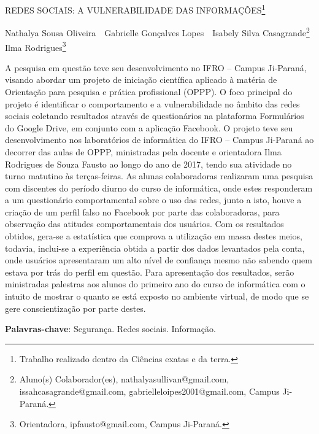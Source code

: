 \documentclass[article,12pt,onesidea,4paper,english,brazil]{abntex2}
\begin{document}
	
	
	\frenchspacing 
	
	\begin{center}
		\LARGE REDES SOCIAIS: A VULNERABILIDADE DAS INFORMAÇÕES\footnote{Trabalho realizado dentro da Ciências exatas e da terra.}
		
		\normalsize
		Nathalya Sousa Oliveira \,\, Gabrielle Gonçalves Lopes \,\, Isabely Silva Casagrande\footnote{Aluno(s) Colaborador(es), nathalyasullivan@gmail.com, issahcasagrande@gmail.com, gabrielleloipes2001@gmail.com, Campus Ji-Paraná.} 
	Ilma Rodrigues\footnote{Orientadora, ipfausto@gmail.com, Campus Ji-Paraná.} 

	\end{center}
	
	\noindent A pesquisa em questão teve seu desenvolvimento no IFRO – Campus Ji-Paraná,
	visando abordar um projeto de iniciação científica aplicado à matéria de Orientação
	para pesquisa e prática profissional (OPPP). O foco principal do projeto é identificar
	o comportamento e a vulnerabilidade no âmbito das redes sociais coletando
	resultados através de questionários na plataforma Formulários do Google Drive, em
	conjunto com a aplicação Facebook. O projeto teve seu desenvolvimento nos
	laboratórios de informática do IFRO – Campus Ji-Paraná ao decorrer das aulas de
	OPPP, ministradas pela docente e orientadora Ilma Rodrigues de Souza Fausto ao
	longo do ano de 2017, tendo sua atividade no turno matutino às terças-feiras. As
	alunas colaboradoras realizaram uma pesquisa com discentes do período diurno do
	curso de informática, onde estes responderam a um questionário comportamental
	sobre o uso das redes, junto a isto, houve a criação de um perfil falso no Facebook
	por parte das colaboradoras, para observação das atitudes comportamentais dos
	usuários. Com os resultados obtidos, gera-se a estatística que comprova a utilização
	em massa destes meios, todavia, inclui-se a experiência obtida a partir dos dados
	levantados pela conta, onde usuários apresentaram um alto nível de confiança
	mesmo não sabendo quem estava por trás do perfil em questão. Para apresentação
	dos resultados, serão ministradas palestras aos alunos do primeiro ano do curso de
	informática com o intuito de mostrar o quanto se está exposto no ambiente virtual, de
	modo que se gere conscientização por parte destes.
	
	\vspace{\onelineskip}
	
	\noindent
	\textbf{Palavras-chave}: Segurança. Redes sociais. Informação.
	
\end{document}
